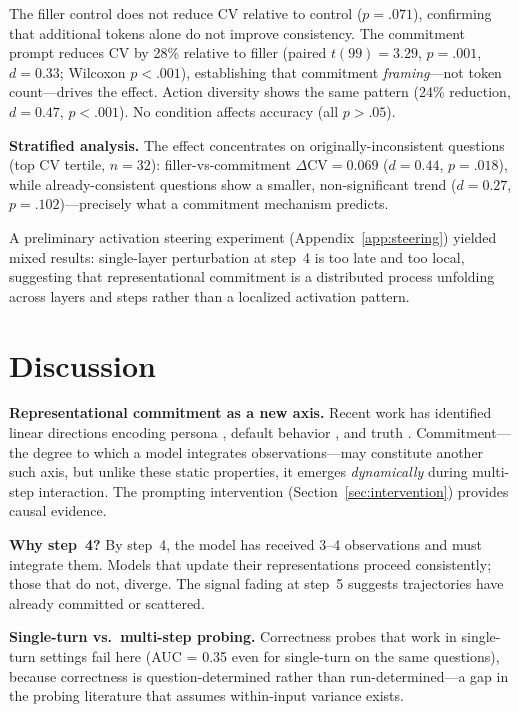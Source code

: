 \documentclass{article}
\begin{document}
The filler control does not reduce CV relative to control ($p = .071$), confirming that additional tokens alone do not improve consistency. The commitment prompt reduces CV by 28\% relative to filler (paired $t(99) = 3.29$, $p = .001$, $d = 0.33$; Wilcoxon $p < .001$), establishing that commitment \emph{framing}---not token count---drives the effect. Action diversity shows the same pattern (24\% reduction, $d = 0.47$, $p < .001$). No condition affects accuracy (all $p > .05$).

\textbf{Stratified analysis.} The effect concentrates on originally-inconsistent questions (top CV tertile, $n = 32$): filler-vs-commitment $\Delta\text{CV} = 0.069$ ($d = 0.44$, $p = .018$), while already-consistent questions show a smaller, non-significant trend ($d = 0.27$, $p = .102$)---precisely what a commitment mechanism predicts.

A preliminary activation steering experiment (Appendix~\ref{app:steering}) yielded mixed results: single-layer perturbation at step~4 is too late and too local, suggesting that representational commitment is a distributed process unfolding across layers and steps rather than a localized activation pattern.

\section{Discussion}

\textbf{Representational commitment as a new axis.} Recent work has identified linear directions encoding persona \citep{anthropic_persona}, default behavior \citep{anthropic_axis}, and truth \citep{marks2024geometry}. Commitment---the degree to which a model integrates observations---may constitute another such axis, but unlike these static properties, it emerges \emph{dynamically} during multi-step interaction. The prompting intervention (Section~\ref{sec:intervention}) provides causal evidence.

\textbf{Why step~4?} By step~4, the model has received 3--4 observations and must integrate them. Models that update their representations proceed consistently; those that do not, diverge. The signal fading at step~5 suggests trajectories have already committed or scattered.

\textbf{Single-turn vs.\ multi-step probing.} Correctness probes that work in single-turn settings \citep{gnosis, stickland2024reasoning} fail here (AUC = 0.35 even for single-turn on the same questions), because correctness is question-determined rather than run-determined---a gap in the probing literature that assumes within-input variance exists.
\end{document}
